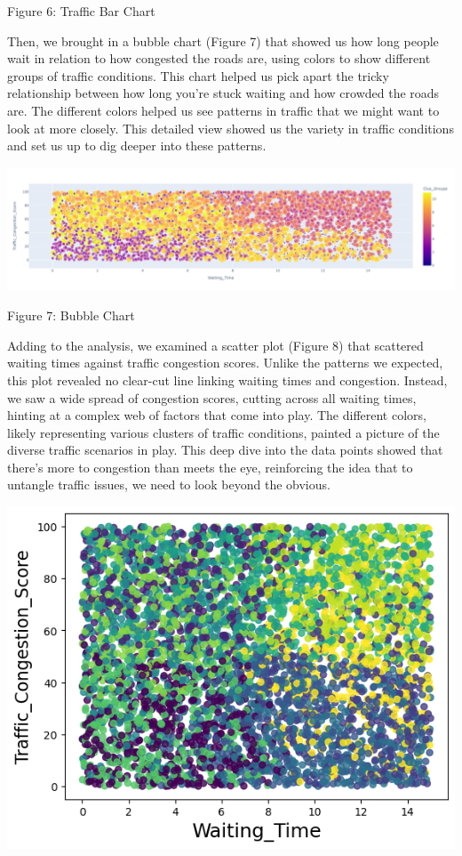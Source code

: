 \documentclass{article}
\begin{document}
\begin{multicols}{2}
{\small
  Figure 6: Traffic Bar Chart
  \par
  \vspace{6pt}
}

Then, we brought in a bubble chart (Figure 7) that showed us how long people wait in relation to how congested the roads are, using colors to show different groups of traffic conditions. This chart helped us pick apart the tricky relationship between how long you're stuck waiting and how crowded the roads are. The different colors helped us see patterns in traffic that we might want to look at more closely. This detailed view showed us the variety in traffic conditions and set us up to dig deeper into these patterns.

\includegraphics[scale=.45]{img/bubble.png}

{\small
  Figure 7: Bubble Chart
  \par
  \vspace{6pt}
}

Adding to the analysis, we examined a scatter plot (Figure 8) that scattered waiting times against traffic congestion scores. Unlike the patterns we expected, this plot revealed no clear-cut line linking waiting times and congestion. Instead, we saw a wide spread of congestion scores, cutting across all waiting times, hinting at a complex web of factors that come into play. The different colors, likely representing various clusters of traffic conditions, painted a picture of the diverse traffic scenarios in play. This deep dive into the data points showed that there's more to congestion than meets the eye, reinforcing the idea that to untangle traffic issues, we need to look beyond the obvious.

\includegraphics[scale=.4]{img/scatter.png}


\end{multicols}
\end{document}
